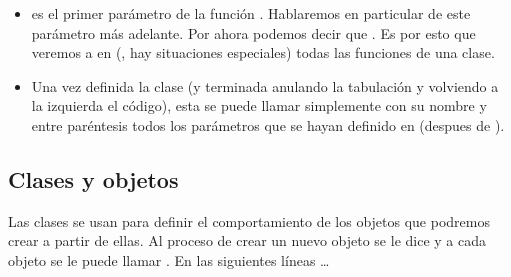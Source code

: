 \documentclass[a5paper,9pt,spanish]{sphinxmanual}
\begin{document}
\begin{itemize}
\item {} 
\sphinxAtStartPar
{} es el primer parámetro de la función . Hablaremos en particular de este
parámetro más adelante. Por ahora podemos decir que . Es
por esto que veremos a  en (, hay situaciones especiales) todas las funciones
de una clase.

\item {} 
\sphinxAtStartPar
Una vez definida la clase (y terminada anulando la tabulación y volviendo a la izquierda
el código), esta se puede llamar simplemente con su nombre y entre paréntesis todos los
parámetros que se hayan definido en  (despues de ).

\end{itemize}


\subsection{Clases y objetos}
\label{\detokenize{class:id1}}
\sphinxAtStartPar
Las clases se usan para definir el comportamiento de los objetos que podremos crear a partir
de ellas. Al proceso de crear un nuevo objeto se le dice  y a cada objeto se le
puede llamar .
En las siguientes líneas …

\begin{sphinxVerbatim}[commandchars=\\\{\}]
   
   
   
\end{sphinxVerbatim}
\end{document}
